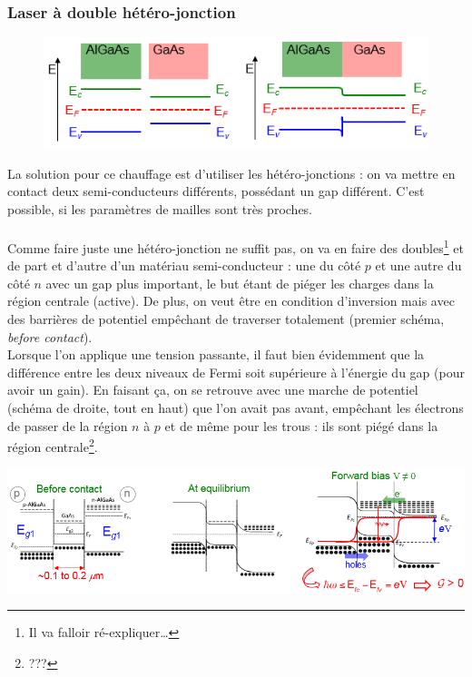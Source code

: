  		\newpage
 		\subsubsection{Laser à double hétéro-jonction}
 		 \begin{figure}
		\vspace{-5mm}
		\includegraphics[scale=0.6]{ch5/image38}
		\end{figure}
 		La solution pour ce chauffage est d'utiliser les hétéro-jonctions : on va mettre en contact
 		deux semi-conducteurs différents, possédant un gap différent. C'est possible, si les 
 		paramètres de mailles sont très proches.\\
 		\ \\
 		
 		Comme faire juste une hétéro-jonction ne suffit pas, on va en faire des doubles\footnote{Il 
 		va falloir ré-expliquer\dots} et de part et d'autre d'un matériau semi-conducteur : une du 
 		côté $p$ et une autre du côté $n$ avec un gap plus important, le but étant de piéger les
 		charges dans la région centrale (active). 
 		De plus, on veut être en condition d'inversion mais avec des barrières de potentiel 
 		empêchant de traverser totalement (premier schéma, \textit{before contact}). \\
 		
 		Lorsque l'on applique une tension passante, il faut bien évidemment que la différence entre 
 		les deux niveaux de Fermi soit supérieure à l'énergie du gap (pour avoir un gain). En faisant 
 		ça, on se retrouve avec une marche de potentiel (schéma de droite, tout en haut) que l'on 
 		avait pas avant, empêchant les électrons de passer de la région $n$ à $p$ et de même pour 
 		les trous : ils sont piégé dans la région centrale\footnote{???}.
	
		\begin{center}
		\includegraphics[scale=0.7]{ch5/image39}
		\end{center}
	
